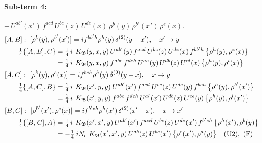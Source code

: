 \documentclass[10pt]{article}
\numberwithin{equation}{section}
\begin{document}
\paragraph{Sub-term 4:} $+\,U^{ab'}(x')\,f^{acd}\,U^{bc}(z)\,U^{de}(x)\,\rho^{b}(y)\,\rho^{b'}(x')\,\rho^{e}(x)$.
\begin{align}
&[A,B]:\ [\rho^{b}(y),\rho^{b'}(x')]=i f^{bb'h}\rho^{h}(y)\,\delta^{(2)}(y-x'),\quad x'\to y\notag\\
&\qquad \tfrac14\{[A,B],C\}=\tfrac14\,i\,\,K_{\mathfrak B}(y,x,y)\,U^{ab'}(y)\,f^{acd}\,U^{bc}(z)\,U^{de}(x)\,f^{bb'h}\,\big\{\rho^{h}(y),\rho^{e}(x)\big\}\notag\\
&\qquad\phantom{\tfrac14\{[A,B],C\}}=\tfrac14\,i\,\,K_{\mathfrak B}(y,x,y)\,f^{abc}\,f^{deh}\,U^{ae}(y)\,U^{db}(z)\,U^{cl}(x)\,\big\{\rho^{h}(y),\rho^{l}(x)\big\}
\label{R:eq:GIII.II-4-AB}\\
&[A,C]:\ [\rho^{b}(y),\rho^{e}(x)]=i f^{beh}\rho^{h}(y)\,\delta^{(2)}(y-x),\quad x\to y\notag\\
&\qquad \tfrac14\{[A,C],B\}=\tfrac14\,i\,\,K_{\mathfrak B}(x',y,y)\,U^{ab'}(x')\,f^{acd}\,U^{bc}(z)\,U^{de}(y)\,f^{beh}\,\big\{\rho^{h}(y),\rho^{b'}(x')\big\}\notag\\
&\qquad\phantom{\tfrac14\{[A,C],B\}}=\tfrac14\,i\,\,K_{\mathfrak B}(x',y,y)\,f^{abc}\,f^{deh}\,U^{al}(x')\,U^{db}(z)\,U^{ce}(y)\,\big\{\rho^{h}(y),\rho^{l}(x')\big\}
\label{R:eq:GIII.II-4-AC}\\
&[B,C]:\ [\rho^{b'}(x'),\rho^{e}(x)]=i f^{b'eh}\rho^{h}(x')\,\delta^{(2)}(x'-x),\quad x\to x'\notag\\
&\qquad \tfrac14\{[B,C],A\}=\tfrac14\,i\,\,K_{\mathfrak B}(x',x',y)\,U^{ab'}(x')\,f^{acd}\,U^{bc}(z)\,U^{de}(x')\,f^{b'eh}\,\big\{\rho^{h}(x'),\rho^{b}(y)\big\}\notag\\
&\qquad\phantom{\tfrac14\{[B,C],A\}}=-\tfrac14\,i N_{c}\,\,K_{\mathfrak B}(x',x',y)\,U^{ab}(z)\,U^{bc}(x')\,\big\{\rho^{c}(x'),\rho^{a}(y)\big\}\quad\text{(U2)},\ \text{(F)}
\label{R:eq:GIII.II-4-BC}
\end{align}
\end{document}

